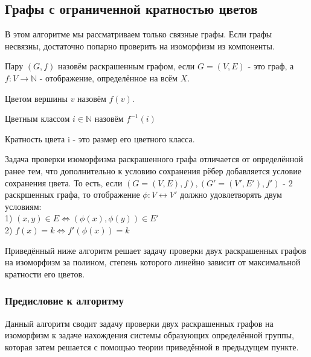 \subsection{Графы с ограниченной кратностью цветов}

В этом алгоритме мы рассматриваем только связные графы. Если графы несвязны, достаточно попарно проверить на изоморфизм из компоненты.

\begin{definition}
    Пару $(G, f)$ назовём раскрашенным графом, если $G=(V, E)$ - это граф, а $f: V \rightarrow \mathbb{N}$ - отображение, определённое на всём $X$.
\end{definition}

\begin{definition}
    Цветом вершины $v$ назовём $f(v)$. 
\end{definition}

\begin{definition}
    Цветным классом $i \in \mathbb{N}$ назовём $f^{-1}(i)$ 
\end{definition}

\begin{definition}
    Кратность цвета i - это размер его цветного класса.
\end{definition}

Задача проверки изоморфизма раскрашенного графа отличается от определённой ранее тем, что дополнительно к условию сохранения рёбер добавляется условие сохранения цвета. То есть, если $(G=(V, E), f), (G'=(V', E'), f')$ - 2 раскршенных графа, то отображение $\phi: V \leftrightarrow V'$ должно удовлетворять двум условиям:\\
1) $(x, y) \in E \Leftrightarrow (\phi(x), \phi(y)) \in E'$\\
2) $f(x) = k \Leftrightarrow f'(\phi(x)) = k$

Приведённый ниже алгоритм решает задачу проверки двух раскрашенных графов на изоморфизм за полином, степень которого линейно зависит от максимальной кратности его цветов.

\subsubsection*{Предисловие к алгоритму}

Данный алгоритм сводит задачу проверки двух раскрашенных графов на изоморфизм к задаче нахождения системы образующих определённой группы, которая затем решается с помощью теории приведённой в предыдущем пункте.

